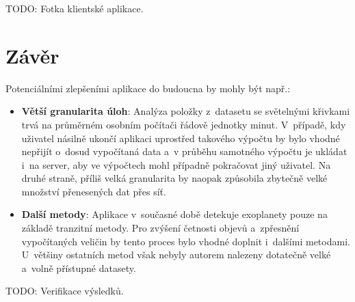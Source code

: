 \documentclass[a4paper,12pt]{article}
\begin{document}
{{{{{{{{{{{{

TODO: Fotka klientské aplikace.


\clearpage\pagestyle{plain}
\section*{Závěr}

{

Potenciálními zlepšeními aplikace do budoucna by mohly být např.:

\begin{itemize}
\item \textbf{Větší granularita úloh}: Analýza položky z~datasetu se světelnými křivkami trvá na průměrném osobním počítači řádově jednotky minut. V~případě, kdy uživatel násilně ukončí aplikaci uprostřed takového výpočtu by bylo vhodné nepřijít o~dosud vypočítaná data a~v průběhu samotného výpočtu je ukládat i~na server, aby ve výpočtech mohl případně pokračovat jiný uživatel. Na druhé straně, příliš velká granularita by naopak způsobila zbytečně velké množství přenesených dat přes síť.

\item \textbf{Další metody}: Aplikace v~současné době detekuje exoplanety pouze na základě tranzitní metody. Pro zvýšení četnosti objevů a~zpřesnění vypočítaných veličin by tento proces bylo vhodné doplnit i~dalšími metodami. U~většiny ostatních metod však nebyly autorem nalezeny dotatečně velké a~volně přístupné datasety.
\end{itemize}


TODO: Verifikace výsledků.

\begin{thebibliography}{99}	%


\end{thebibliography}}}}}}}}}}}}}}
\end{document}
